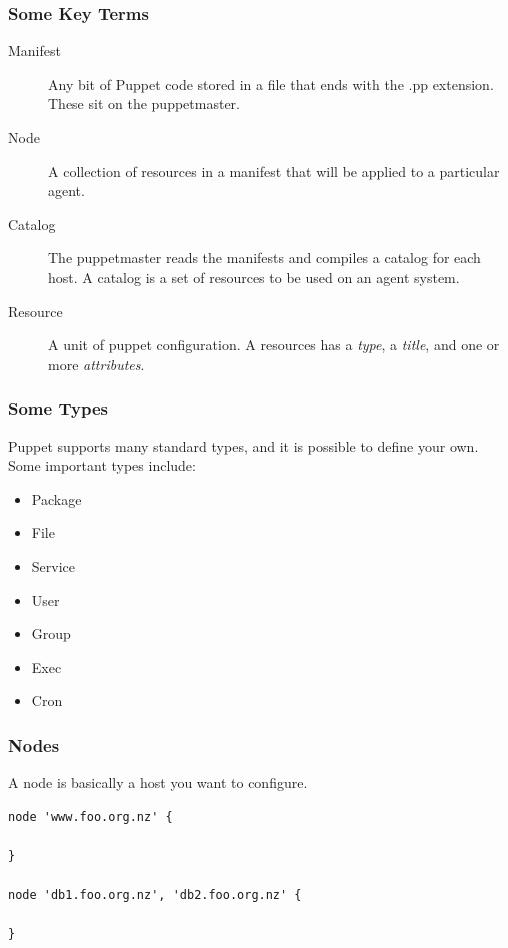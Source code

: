 \documentclass[10pt]{beamer}
\begin{document}
\begin{frame}
  \frametitle{Some Key Terms}

 \begin{description}
  \item[Manifest] Any bit of Puppet code stored in a file that ends with the .pp extension.  These sit on the puppetmaster.
  \item[Node] A collection of resources in a manifest that will be applied to a particular agent.
  \item[Catalog] The puppetmaster reads the manifests and compiles a catalog for each host. A catalog is a set of resources to be used on an agent system.
  \item[Resource]A unit of puppet configuration.  A resources has a \emph{type}, a \emph{title}, and one or more \emph{attributes}.

  \end{description}

\end{frame}
\begin{frame}
  \frametitle{Some Types}

Puppet supports many standard types, and it is possible to define your own.  Some important types include:
\begin{itemize}
\item Package
\item File
\item Service
\item User
\item Group
\item Exec
\item Cron
\end{itemize}


\end{frame}

\begin{frame}[fragile]
  \frametitle{Nodes}

A node is basically a host you want to configure.
\begin{verbatim}
node 'www.foo.org.nz' {

}

node 'db1.foo.org.nz', 'db2.foo.org.nz' {

}
\end{verbatim}


\end{frame}
\end{document}
